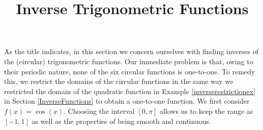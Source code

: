 \documentclass[12pt]{ximera}
\title{Inverse Trigonometric Functions}
\begin{document}
\maketitle

\setcounter{footnote}{0}

\label{ArcTrig}

As the title indicates, in this section we concern ourselves with finding inverses of the (circular) trigonometric functions.  Our immediate problem is that, owing to their periodic nature, none of the six circular functions is  one-to-one. To remedy this, we restrict the domains of the circular functions in the same way we restricted the domain of the quadratic function in Example \ref{inverserestrictionex} in Section \ref{InverseFunctions} to obtain a one-to-one function.  We first consider $f(x) = \cos(x)$. Choosing the interval $[0,\pi]$ allows us to keep the range as $[-1,1]$ as well as the properties of being smooth and continuous.

\begin{center}



\end{center} 
\end{document}
